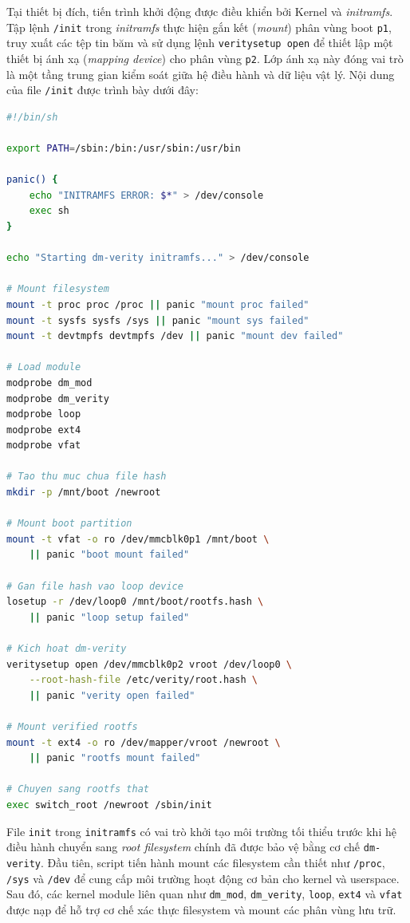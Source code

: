 Tại thiết bị đích, tiến trình khởi động được điều khiển bởi Kernel và \textit{initramfs}. Tập lệnh \texttt{/init} trong \textit{initramfs} thực hiện gắn kết (\textit{mount}) phân vùng boot \texttt{p1}, truy xuất các tệp tin băm và sử dụng lệnh \texttt{veritysetup open} để thiết lập một thiết bị ánh xạ (\textit{mapping device}) cho phân vùng \texttt{p2}. Lớp ánh xạ này đóng vai trò là một tầng trung gian kiểm soát giữa hệ điều hành và dữ liệu vật lý.
Nội dung của file \texttt{/init} được trình bày dưới đây:\\
\begin{lstlisting}[style=thesisstyle, language=bash]
#!/bin/sh

export PATH=/sbin:/bin:/usr/sbin:/usr/bin

panic() {
    echo "INITRAMFS ERROR: $*" > /dev/console
    exec sh
}

echo "Starting dm-verity initramfs..." > /dev/console

# Mount filesystem
mount -t proc proc /proc || panic "mount proc failed"
mount -t sysfs sysfs /sys || panic "mount sys failed"
mount -t devtmpfs devtmpfs /dev || panic "mount dev failed"

# Load module
modprobe dm_mod
modprobe dm_verity
modprobe loop
modprobe ext4
modprobe vfat

# Tao thu muc chua file hash
mkdir -p /mnt/boot /newroot

# Mount boot partition
mount -t vfat -o ro /dev/mmcblk0p1 /mnt/boot \
    || panic "boot mount failed"

# Gan file hash vao loop device
losetup -r /dev/loop0 /mnt/boot/rootfs.hash \
    || panic "loop setup failed"

# Kich hoat dm-verity
veritysetup open /dev/mmcblk0p2 vroot /dev/loop0 \
    --root-hash-file /etc/verity/root.hash \
    || panic "verity open failed"

# Mount verified rootfs
mount -t ext4 -o ro /dev/mapper/vroot /newroot \
    || panic "rootfs mount failed"

# Chuyen sang rootfs that
exec switch_root /newroot /sbin/init
\end{lstlisting}

File \texttt{init} trong \texttt{initramfs} có vai trò khởi tạo môi trường tối thiểu trước khi hệ điều hành chuyển sang \textit{root filesystem} chính đã được bảo vệ bằng cơ chế \texttt{dm-verity}. Đầu tiên, script tiến hành mount các filesystem cần thiết như \texttt{/proc}, \texttt{/sys} và \texttt{/dev} để cung cấp môi trường hoạt động cơ bản cho kernel và userspace. Sau đó, các kernel module liên quan như \texttt{dm\_mod}, \texttt{dm\_verity}, \texttt{loop}, \texttt{ext4} và \texttt{vfat} được nạp để hỗ trợ cơ chế xác thực filesystem và mount các phân vùng lưu trữ.

